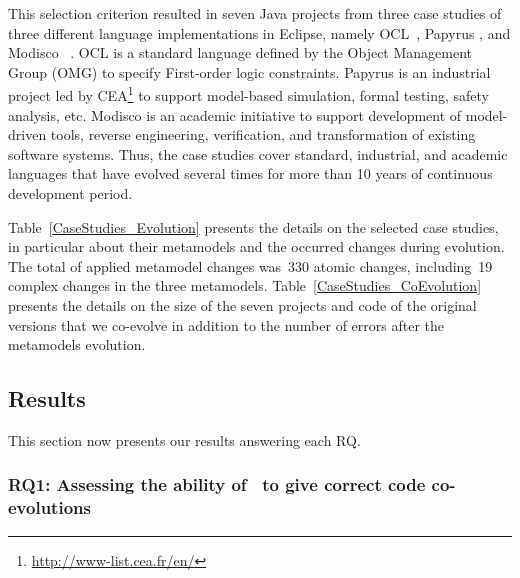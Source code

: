 
This selection criterion resulted in seven Java projects from three case studies of three different language implementations in Eclipse, namely OCL~\cite{MDTOCL}, Papyrus \cite{MDTPapyrus}, and Modisco~\cite{MDTModisco} .
%
OCL is a standard language defined by the Object Management Group (OMG) to specify First-order logic constraints. Papyrus is an industrial project led by CEA\footnote{\url{http://www-list.cea.fr/en/}} to support model-based simulation, formal testing, safety analysis, etc. Modisco is an academic initiative to support development of model-driven tools, reverse engineering, verification, and transformation of existing software systems. 
Thus, the case studies cover standard, industrial, and academic languages that have evolved several times for more than 10 years of continuous development period.

Table~\ref{CaseStudies_Evolution} presents the details on the selected case studies, in particular about their metamodels and the occurred changes during evolution. The total of applied metamodel changes was~330 atomic changes, including~19 complex changes in the three metamodels. 
%
Table~\ref{CaseStudies_CoEvolution} presents the details on the size of the seven projects and code of the original versions that we co-evolve in addition to the number of errors after the metamodels evolution. 

\subsection{Results}
\label{ch3__results}
This section now presents our results answering each RQ. 

\subsubsection{RQ1: Assessing the ability of \LLM~to give correct code co-evolutions }


